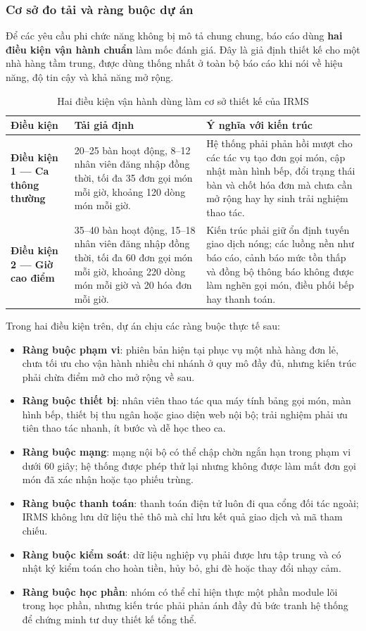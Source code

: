 \documentclass[11pt,a4paper]{article}
\begin{document}
\subsubsection{Cơ sở đo tải và ràng buộc dự án}
Để các yêu cầu phi chức năng không bị mô tả chung chung, báo cáo dùng \textbf{hai điều kiện vận hành chuẩn} làm mốc đánh giá. Đây là giả định thiết kế cho một nhà hàng tầm trung, được dùng thống nhất ở toàn bộ báo cáo khi nói về hiệu năng, độ tin cậy và khả năng mở rộng.

\begin{table}[H]
\centering
\caption{Hai điều kiện vận hành dùng làm cơ sở thiết kế của IRMS}
\small
\begin{tabularx}{\textwidth}{>{\bfseries}p{3.2cm} p{4.4cm} X}
\toprule
Điều kiện & Tải giả định & Ý nghĩa với kiến trúc \\
\midrule
Điều kiện 1 --- Ca thông thường & 20--25 bàn hoạt động, 8--12 nhân viên đăng nhập đồng thời, tối đa 35 đơn gọi món mỗi giờ, khoảng 120 dòng món mỗi giờ. & Hệ thống phải phản hồi mượt cho các tác vụ tạo đơn gọi món, cập nhật màn hình bếp, đổi trạng thái bàn và chốt hóa đơn mà chưa cần mở rộng hay hy sinh trải nghiệm thao tác. \\
Điều kiện 2 --- Giờ cao điểm & 35--40 bàn hoạt động, 15--18 nhân viên đăng nhập đồng thời, tối đa 60 đơn gọi món mỗi giờ, khoảng 220 dòng món mỗi giờ và 20 hóa đơn mỗi giờ. & Kiến trúc phải giữ ổn định tuyến giao dịch nóng; các luồng nền như báo cáo, cảnh báo mức tồn thấp và đồng bộ thông báo không được làm nghẽn gọi món, điều phối bếp hay thanh toán. \\
\bottomrule
\end{tabularx}
\end{table}

Trong hai điều kiện trên, dự án chịu các ràng buộc thực tế sau:
\begin{itemize}
    \item \textbf{Ràng buộc phạm vi}: phiên bản hiện tại phục vụ một nhà hàng đơn lẻ, chưa tối ưu cho vận hành nhiều chi nhánh ở quy mô đầy đủ, nhưng kiến trúc phải chừa điểm mở cho mở rộng về sau.
    \item \textbf{Ràng buộc thiết bị}: nhân viên thao tác qua máy tính bảng gọi món, màn hình bếp, thiết bị thu ngân hoặc giao diện web nội bộ; trải nghiệm phải ưu tiên thao tác nhanh, ít bước và dễ học theo ca.
    \item \textbf{Ràng buộc mạng}: mạng nội bộ có thể chập chờn ngắn hạn trong phạm vi dưới 60 giây; hệ thống được phép thử lại nhưng không được làm mất đơn gọi món đã xác nhận hoặc tạo phiếu trùng.
    \item \textbf{Ràng buộc thanh toán}: thanh toán điện tử luôn đi qua cổng đối tác ngoài; IRMS không lưu dữ liệu thẻ thô mà chỉ lưu kết quả giao dịch và mã tham chiếu.
    \item \textbf{Ràng buộc kiểm soát}: dữ liệu nghiệp vụ phải được lưu tập trung và có nhật ký kiểm toán cho hoàn tiền, hủy bỏ, ghi đè hoặc thay đổi nhạy cảm.
    \item \textbf{Ràng buộc học phần}: nhóm có thể chỉ hiện thực một phần module lõi trong học phần, nhưng kiến trúc phải phản ánh đầy đủ bức tranh hệ thống để chứng minh tư duy thiết kế tổng thể.
\end{itemize}
\end{document}
